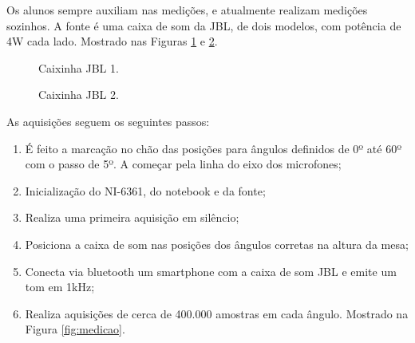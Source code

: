 \documentclass[a4paper,oneside,12pt]{article}
\begin{document}
Os alunos sempre auxiliam nas medições, e atualmente realizam medições sozinhos. A fonte é uma caixa de som da JBL, de dois modelos, com potência de 4W cada lado. Mostrado nas Figuras \ref{fig:jbl1} e \ref{fig:jbl2}.  

\begin{figure}
\centering
{}
\caption{Caixinha JBL 1.}\label{fig:jbl1}
\end{figure}

\begin{figure}
\centering
{}
\caption{Caixinha JBL 2.}\label{fig:jbl2}
\end{figure}

As aquisições seguem os seguintes passos:

\begin{enumerate}
\item É feito a marcação no chão das posições para ângulos definidos de 0º até 60º com o passo de 5º. A começar pela linha do eixo dos microfones;
\item Inicialização do NI-6361, do notebook e da fonte;
\item Realiza uma primeira aquisição em silêncio;
\item Posiciona a caixa de som nas posições dos ângulos corretas na altura da mesa;
\item Conecta via bluetooth um smartphone com a caixa de som JBL e emite um tom em 1kHz;
\item Realiza aquisições de cerca de 400.000 amostras em cada ângulo. Mostrado na Figura \ref{fig:medicao}.
\end{enumerate}
\end{document}
